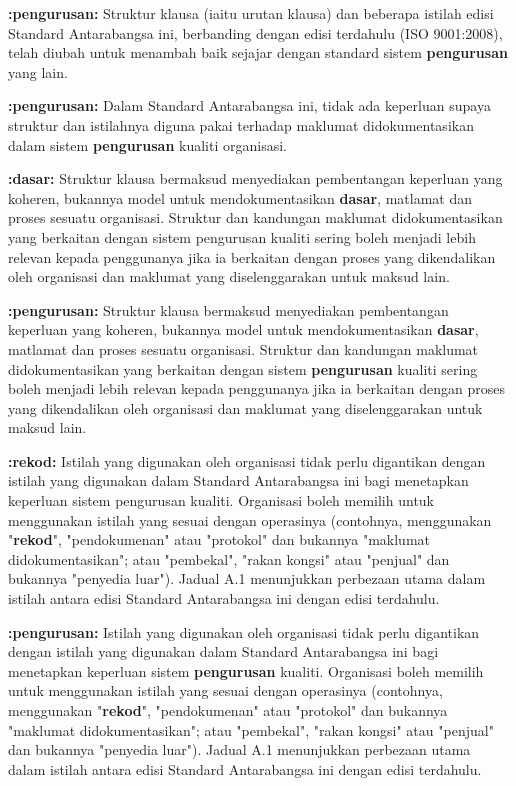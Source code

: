 \documentclass{article}
\begin{document}
\textbf{:pengurusan:} Struktur klausa (iaitu urutan klausa) dan beberapa istilah edisi Standard Antarabangsa ini,
berbanding dengan edisi terdahulu (ISO 9001:2008), telah diubah untuk menambah baik
sejajar dengan standard sistem \textbf{pengurusan} yang lain.

\textbf{:pengurusan:} Dalam Standard Antarabangsa ini, tidak ada keperluan supaya struktur dan istilahnya diguna
pakai terhadap maklumat didokumentasikan dalam sistem \textbf{pengurusan} kualiti organisasi.

\textbf{:dasar:} Struktur klausa bermaksud menyediakan pembentangan keperluan yang koheren, bukannya
model untuk mendokumentasikan \textbf{dasar}, matlamat dan proses sesuatu organisasi. Struktur
dan kandungan maklumat didokumentasikan yang berkaitan dengan sistem pengurusan
kualiti sering boleh menjadi lebih relevan kepada penggunanya jika ia berkaitan dengan
proses yang dikendalikan oleh organisasi dan maklumat yang diselenggarakan untuk maksud
lain.

\textbf{:pengurusan:} Struktur klausa bermaksud menyediakan pembentangan keperluan yang koheren, bukannya
model untuk mendokumentasikan \textbf{dasar}, matlamat dan proses sesuatu organisasi. Struktur
dan kandungan maklumat didokumentasikan yang berkaitan dengan sistem \textbf{pengurusan}
kualiti sering boleh menjadi lebih relevan kepada penggunanya jika ia berkaitan dengan
proses yang dikendalikan oleh organisasi dan maklumat yang diselenggarakan untuk maksud
lain.

\textbf{:rekod:} Istilah yang digunakan oleh organisasi tidak perlu digantikan dengan istilah yang digunakan
dalam Standard Antarabangsa ini bagi menetapkan keperluan sistem pengurusan kualiti.
Organisasi boleh memilih untuk menggunakan istilah yang sesuai dengan operasinya
(contohnya, menggunakan "\textbf{rekod}", "pendokumenan" atau "protokol" dan bukannya
"maklumat didokumentasikan"; atau "pembekal", "rakan kongsi" atau "penjual" dan bukannya
"penyedia luar"). Jadual A.1 menunjukkan perbezaan utama dalam istilah antara edisi
Standard Antarabangsa ini dengan edisi terdahulu.

\textbf{:pengurusan:} Istilah yang digunakan oleh organisasi tidak perlu digantikan dengan istilah yang digunakan
dalam Standard Antarabangsa ini bagi menetapkan keperluan sistem \textbf{pengurusan} kualiti.
Organisasi boleh memilih untuk menggunakan istilah yang sesuai dengan operasinya
(contohnya, menggunakan "\textbf{rekod}", "pendokumenan" atau "protokol" dan bukannya
"maklumat didokumentasikan"; atau "pembekal", "rakan kongsi" atau "penjual" dan bukannya
"penyedia luar"). Jadual A.1 menunjukkan perbezaan utama dalam istilah antara edisi
Standard Antarabangsa ini dengan edisi terdahulu.
\end{document}
